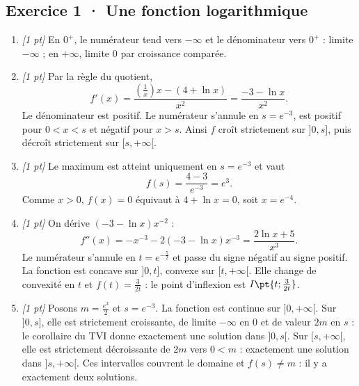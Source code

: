 \subsection*{Exercice 1 · Une fonction logarithmique}\begin{enumerate}

\item \textit{[1 pt]} En $0^+$, le numérateur tend vers $-\infty$ et le dénominateur vers $0^+$ : limite $-\infty$ ; en $+\infty$, limite $0$ par croissance comparée.

\item \textit{[1 pt]} Par la règle du quotient,
\[f'(x)=\frac{(\frac{1}{x})x-(4+\ln x)}{x^2}=\frac{-3-\ln x}{x^2}.\]
Le dénominateur est positif. Le numérateur s'annule en $s=e^{-3}$, est positif pour $0<x<s$ et négatif pour $x>s$. Ainsi $f$ croît strictement sur $]0,s]$, puis décroît strictement sur $[s,+\infty[$.

\item \textit{[1 pt]} Le maximum est atteint uniquement en $s=e^{-3}$ et vaut
\[f(s)=\frac{4- 3}{e^{-3}}=e^{3}.\]
Comme $x>0$, $f(x)=0$ équivaut à $4+\ln x=0$, soit $x=e^{-4}$.

\item \textit{[1 pt]} On dérive $(-3-\ln x)x^{-2}$ :
\[f''(x)=-x^{-3}-2(-3-\ln x)x^{-3}=\frac{2\ln x+5}{x^3}.\]
Le numérateur s'annule en $t=e^{-\frac{5}{2}}$ et passe du signe négatif au signe positif. La fonction est concave sur $]0,t]$, convexe sur $[t,+\infty[$. Elle change de convexité en $t$ et $f(t)=\frac{3}{2t}$ : le point d'inflexion est $I\pt{t;\frac{3}{2t}}$.

\item \textit{[1 pt]} Posons $m=\frac{e^{3}}{2}$ et $s=e^{-3}$. La fonction est continue sur $]0,+\infty[$. Sur $]0,s]$, elle est strictement croissante, de limite $-\infty$ en $0$ et de valeur $2m$ en $s$ : le corollaire du TVI donne exactement une solution dans $]0,s[$. Sur $[s,+\infty[$, elle est strictement décroissante de $2m$ vers $0<m$ : exactement une solution dans $]s,+\infty[$. Ces intervalles couvrent le domaine et $f(s)\ne m$ : il y a exactement deux solutions.

\end{enumerate}

